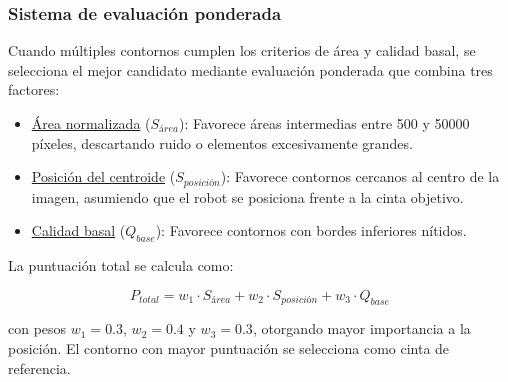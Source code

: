 \subsubsection{Sistema de evaluación ponderada}

Cuando múltiples contornos cumplen los criterios de área y calidad basal, se selecciona el mejor candidato mediante evaluación ponderada que combina tres factores:

\begin{itemize}
    \item \underline{Área normalizada} ($S_{área}$): Favorece áreas intermedias entre 500 y 50000 píxeles, descartando ruido o elementos excesivamente grandes.

    \item \underline{Posición del centroide} ($S_{posición}$): Favorece contornos cercanos al centro de la imagen, asumiendo que el robot se posiciona frente a la cinta objetivo.

    \item \underline{Calidad basal} ($Q_{base}$): Favorece contornos con bordes inferiores nítidos.
\end{itemize}

La puntuación total se calcula como:

\begin{equation}
P_{total} = w_1 \cdot S_{área} + w_2 \cdot S_{posición} + w_3 \cdot Q_{base}
\end{equation}

con pesos $w_1 = 0.3$, $w_2 = 0.4$ y $w_3 = 0.3$, otorgando mayor importancia a la posición. El contorno con mayor puntuación se selecciona como cinta de referencia.

